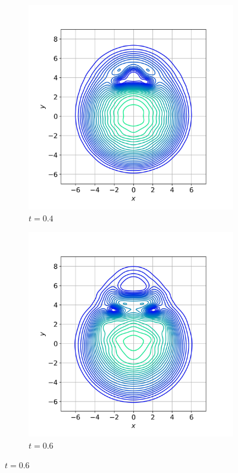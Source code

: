 \documentclass{article}
\begin{document}
\begin{figure}
\begin{subfigure}[b]{.45\linewidth}
\includegraphics[width=\linewidth]{imgs/vortex_contour/contour_vortices_40.jpeg}
\caption{$t = 0.4$}\label{fig:gull}
\end{subfigure}
\begin{subfigure}[b]{.45\linewidth}
\includegraphics[width=\linewidth]{imgs/vortex_contour/contour_vortices_60.jpeg}
\caption{$t = 0.6$}\label{fig:tiger}
\end{subfigure}


\end{figure}
\end{document}
